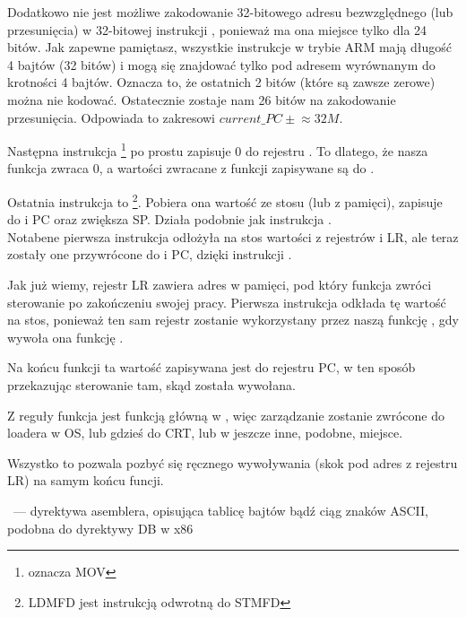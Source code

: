 Dodatkowo nie jest możliwe zakodowanie 32-bitowego adresu bezwzględnego (lub przesunięcia) w 32-bitowej instrukcji , ponieważ ma ona miejsce tylko dla 24 bitów.
Jak zapewne pamiętasz, wszystkie instrukcje w trybie ARM mają długość 4 bajtów (32 bitów) i mogą się znajdować tylko pod adresem wyrównanym do krotności 4 bajtów.
Oznacza to, że ostatnich 2 bitów (które są zawsze zerowe) można nie kodować.
Ostatecznie zostaje nam 26 bitów na zakodowanie przesunięcia. Odpowiada to zakresowi $current\_PC \pm{} \approx{}32M$.

Następna instrukcja \footnote{oznacza MOV}
po prostu zapisuje 0 do rejestru .
To dlatego, że nasza funkcja zwraca 0, a wartości zwracane z funkcji zapisywane są do .

Ostatnia instrukcja to \footnote{\ac{LDMFD} jest instrukcją odwrotną do \ac{STMFD}}.
Pobiera ona wartość ze stosu (lub z pamięci), zapisuje do  i \ac{PC} oraz zwiększa  \ac{SP}. Działa podobnie jak instrukcja \POP.\\
Notabene pierwsza instrukcja  odłożyła na stos wartości z rejestrów  i \ac{LR}, ale teraz zostały one przywrócone do  i \ac{PC}, dzięki instrukcji .

Jak już wiemy, rejestr \ac{LR} zawiera adres w pamięci, pod który funkcja zwróci sterowanie po zakończeniu swojej pracy.
Pierwsza instrukcja odkłada tę wartość na stos, ponieważ ten sam rejestr zostanie wykorzystany przez naszą funkcję \main, gdy wywoła ona funkcję \printf.

Na końcu funkcji ta wartość zapisywana jest do rejestru \ac{PC}, w ten sposób przekazując sterowanie tam, skąd została wywołana.

Z reguły funkcja \main jest funkcją główną w \CCpp, więc zarządzanie zostanie zwrócone do loadera w \ac{OS}, lub gdzieś do \ac{CRT}, lub w jeszcze inne, podobne, miejsce.

Wszystko to pozwala pozbyć się ręcznego wywoływania  (skok pod adres z rejestru \ac{LR}) na samym końcu funcji.

~--- dyrektywa asemblera, opisująca tablicę bajtów bądź ciąg znaków ASCII, podobna do dyrektywy DB w x86


